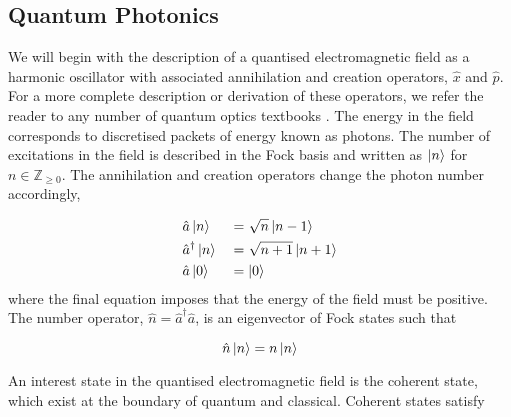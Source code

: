 %

\subsection{Quantum Photonics}

We will begin with the description of a quantised electromagnetic field as a harmonic oscillator with associated annihilation and creation operators, $\hat{x}$ and $\hat{p}$. For a more complete description or derivation of these operators, we refer the reader to any number of quantum optics textbooks \cite{gerry2005introductory, fox2006quantum, loudon2000quantum}. The energy in the field corresponds to discretised packets of energy known as photons. The number of excitations in the field is described in the Fock basis and written as $\ket{n}$ for $n\in \mathbb{Z}_{\ge 0}$. The annihilation and creation operators change the photon number accordingly,

\begin{alignat}{2}
	&\hat{a}\ket{n} &&= \sqrt{n}\ket{n-1}\\
	&\hat{a}^\dagger \ket{n} &&= \sqrt{n+1}\ket{n+1}\\
	&\hat{a}\ket{0} && = \ket{0}
\end{alignat}
where the final equation imposes that the energy of the field must be positive. The number operator, $\hat{n} = \hat{a}^\dagger\hat{a}$, is an eigenvector of Fock states such that

\begin{equation}
	\hat{n}\ket{n} = n\ket{n}
\end{equation}



An interest state in the quantised electromagnetic field is the coherent state, which exist at the boundary of quantum and classical. Coherent states satisfy 

